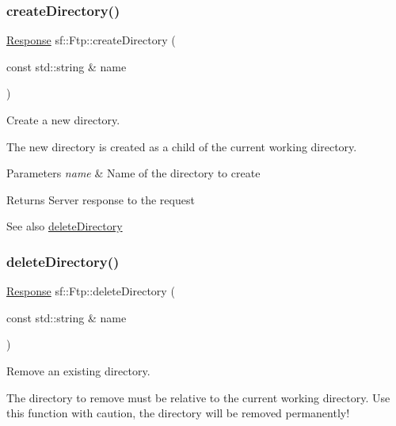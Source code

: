 \subsubsection{\texorpdfstring{createDirectory()}{createDirectory()}}
{\footnotesize\ttfamily \mbox{\hyperlink{classsf_1_1_ftp_1_1_response}{Response}} sf\+::\+Ftp\+::create\+Directory (\begin{DoxyParamCaption}\item[{const std\+::string \&}]{name }\end{DoxyParamCaption})}



Create a new directory. 

The new directory is created as a child of the current working directory.


\begin{DoxyParams}{Parameters}
{\em name} & Name of the directory to create\\
\hline
\end{DoxyParams}
\begin{DoxyReturn}{Returns}
Server response to the request
\end{DoxyReturn}
\begin{DoxySeeAlso}{See also}
\mbox{\hyperlink{classsf_1_1_ftp_a2a8a7ef9144204b5b319c9a4be8806c2}{delete\+Directory}} \begin{DoxyVerb}\end{DoxyVerb}
 
\end{DoxySeeAlso}
\mbox{\label{classsf_1_1_ftp_a2a8a7ef9144204b5b319c9a4be8806c2}} 
\subsubsection{\texorpdfstring{deleteDirectory()}{deleteDirectory()}}
{\footnotesize\ttfamily \mbox{\hyperlink{classsf_1_1_ftp_1_1_response}{Response}} sf\+::\+Ftp\+::delete\+Directory (\begin{DoxyParamCaption}\item[{const std\+::string \&}]{name }\end{DoxyParamCaption})}



Remove an existing directory. 

The directory to remove must be relative to the current working directory. Use this function with caution, the directory will be removed permanently!


